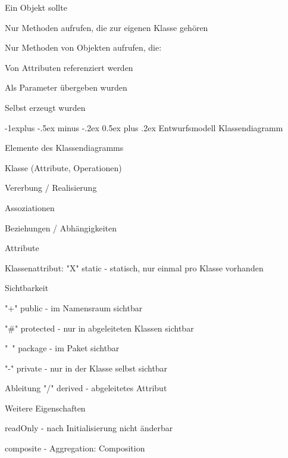 \documentclass[a4paper]{article}
\makeatletter
\renewcommand{\subsection}{\@startsection{subsection}{2}{0mm}%
                                {-1explus -.5ex minus -.2ex}%
                                {0.5ex plus .2ex}%
                                {\normalfont\normalsize\bfseries}}
\makeatother
\begin{document}
\begin{multicols}{3}
  Ein Objekt sollte
  \begin{itemize*}
    \item Nur Methoden aufrufen, die zur eigenen Klasse gehören
    \item Nur Methoden von Objekten aufrufen, die:
    \begin{itemize*}
      \item Von Attributen referenziert werden
      \item Als Parameter übergeben wurden
      \item Selbst erzeugt wurden
    \end{itemize*}
  \end{itemize*}

  \subsection{Entwurfsmodell Klassendiagramm}
  \begin{itemize*}
    \item Elemente des Klassendiagramms
    \begin{itemize*}
      \item Klasse (Attribute, Operationen)
      \item Vererbung / Realisierung
      \item Assoziationen
      \item Beziehungen / Abhängigkeiten
    \end{itemize*}
    \item Attribute
    \begin{itemize*}
      \item Klassenattribut: "X" static - statisch, nur einmal pro Klasse vorhanden
      \item Sichtbarkeit
      \item "+" public - im Namensraum sichtbar
      \item "\#" protected - nur in abgeleiteten Klassen sichtbar
      \item "~" package - im Paket sichtbar
      \item "-" private - nur in der Klasse selbst sichtbar
      \item Ableitung "/" derived - abgeleitetes Attribut
    \end{itemize*}
    \item Weitere Eigenschaften
    \begin{itemize*}
      \item readOnly - nach Initialisierung nicht änderbar
      \item composite - Aggregation: Composition

\end{itemize*}
\end{itemize*}
\end{multicols}
\end{document}
